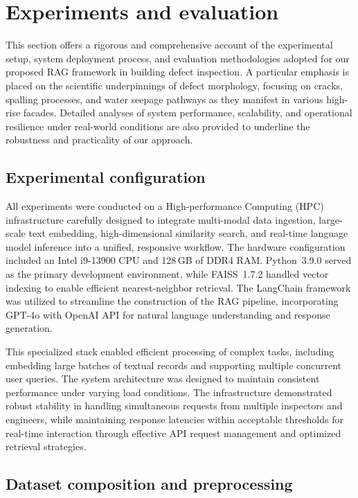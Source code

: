 \documentclass[a4paper,fleqn]{cas-sc}
\begin{document}
\section{Experiments and evaluation}
\label{sec:experiments}

This section offers a rigorous and comprehensive account of the experimental setup, system deployment process, and evaluation methodologies adopted for our proposed RAG framework in building defect inspection. A particular emphasis is placed on the scientific underpinnings of defect morphology, focusing on cracks, spalling processes, and water seepage pathways as they manifest in various high-rise facades. Detailed analyses of system performance, scalability, and operational resilience under real-world conditions are also provided to underline the robustness and practicality of our approach.

\subsection{Experimental configuration}

All experiments were conducted on a High-performance Computing (HPC) infrastructure carefully designed to integrate multi-modal data ingestion, large-scale text embedding, high-dimensional similarity search, and real-time language model inference into a unified, responsive workflow. The hardware configuration included an Intel i9-13900 CPU and 128\,GB of DDR4 RAM. Python~3.9.0 served as the primary development environment, while FAISS~1.7.2 handled vector indexing to enable efficient nearest-neighbor retrieval. The LangChain framework was utilized to streamline the construction of the RAG pipeline, incorporating GPT-4o with OpenAI API for natural language understanding and response generation.

This specialized stack enabled efficient processing of complex tasks, including embedding large batches of textual records and supporting multiple concurrent user queries. The system architecture was designed to maintain consistent performance under varying load conditions. The infrastructure demonstrated robust stability in handling simultaneous requests from multiple inspectors and engineers, while maintaining response latencies within acceptable thresholds for real-time interaction through effective API request management and optimized retrieval strategies.

\subsection{Dataset composition and preprocessing}
\end{document}

